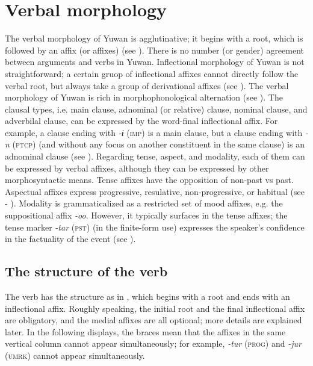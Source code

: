 \chapter{Verbal morphology}\label{chap:8}

The verbal morphology of Yuwan is agglutinative; it begins with a root, which is followed by an affix (or affixes) (see ). There is no number (or gender) agreement between arguments and verbs in Yuwan. Inflectional morphology of Yuwan is not straightforward; a certain gruop of inflectional affixes cannot directly follow the verbal root, but always take a group of derivational affixes (see ). The verbal morphology of Yuwan is rich in morphophonological alternation (see ). The clausal types, i.e. main clause, adnominal (or relative) clause, nominal clause, and adverbilal clause, can be expressed by the word-final inflectional affix. For example, a clause ending with \textit{-ɨ} (\textsc{imp}) is a main clause, but a clause ending with \textit{-n} (\textsc{ptcp}) (and without any focus on another constituent in the same clause) is an adnominal clause (see ). Regarding tense, aspect, and modality, each of them can be expressed by verbal affixes, although they can be expressed by other morphosyntactic means. Tense affixes have the opposition of non-past vs past. Aspectual affixes express progressive, resulative, non-progressive, or habitual (see  - ). Modality is grammaticalized as a restricted set of mood affixes, e.g. the suppositional affix \textit{-oo}. However, it typically surfaces in the tense affixes; the tense marker \textit{-tar} (\textsc{pst}) (in the finite-form use) expresses the speaker’s confidence in the factuality of the event (see ).

\section{The structure of the verb}
\label{bkm:Ref303739828}
The verb has the structure as in , which begins with a root and ends with an inflectional affix. Roughly speaking, the initial root and the final inflectional affix are obligatory, and the medial affixes are all optional; more details are explained later. In the following displays, the braces mean that the affixes in the same vertical column cannot appear simultaneously; for example, \textit{-tur} (\textsc{prog}) and \textit{-jur} (\textsc{umrk}) cannot appear simultaneously.

